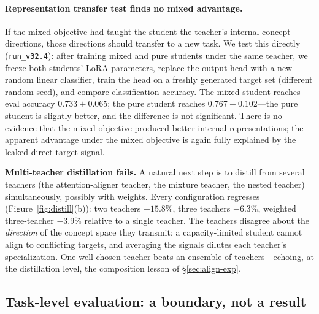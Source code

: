 \documentclass[10pt,twoside]{article}
\theoremstyle{definition}
\begin{document}
\paragraph{Representation transfer test finds no mixed advantage.}
If the mixed objective had taught the student the teacher's internal concept directions, those directions should transfer to a new task. We test this directly (\texttt{run\_v32.4}): after training mixed and pure students under the same teacher, we freeze both students' LoRA parameters, replace the output head with a new random linear classifier, train the head on a freshly generated target set (different random seed), and compare classification accuracy. The mixed student reaches eval accuracy $0.733 \pm 0.065$; the pure student reaches $0.767 \pm 0.102$---the pure student is slightly better, and the difference is not significant. There is no evidence that the mixed objective produced better internal representations; the apparent advantage under the mixed objective is again fully explained by the leaked direct-target signal.

\textbf{Multi-teacher distillation fails.} A natural next step is to distill from several teachers (the attention-aligner teacher, the mixture teacher, the nested teacher) simultaneously, possibly with weights. Every configuration regresses (Figure~\ref{fig:distill}(b)): two teachers $-15.8\%$, three teachers $-6.3\%$, weighted three-teacher $-3.9\%$ relative to a single teacher. The teachers disagree about the \emph{direction} of the concept space they transmit; a capacity-limited student cannot align to conflicting targets, and averaging the signals dilutes each teacher's specialization. One well-chosen teacher beats an ensemble of teachers---echoing, at the distillation level, the composition lesson of \S\ref{sec:align-exp}.

\subsection{Task-level evaluation: a boundary, not a result}
\label{sec:vqa-exp}
\end{document}
